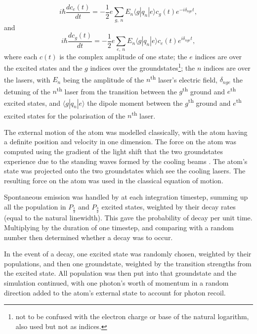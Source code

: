 \begin{equation}
i\hbar\frac{dc_e(t)}{dt} = -\frac12e\sum_{g,\ n} E_n \langle g |  q_n | e \rangle c_g(t) e^{-i\delta_{nge}t},
\end{equation}
and
\begin{equation}
i\hbar\frac{dc_g(t)}{dt} = -\frac12e\sum_{e,\ n} E_n \langle g |  q_n | e \rangle c_e(t) e^{i\delta_{nge}t},
\end{equation}
where each $c(t)$ is the complex amplitude of one state; the $e$ indices are over the excited states and the $g$ indices over the groundstates\footnote{not to be confused with the electron charge or base of the natural logarithm, also used but not as indices.}; the $n$ indices are over the lasers, with $E_n$ being the amplitude of the $n$\textsuperscript{th} laser's electric field, $\delta_{nge}$ the detuning of the $n$\textsuperscript{th} laser from the transition between the $g$\textsuperscript{th} ground and $e$\textsuperscript{th} excited states, and $\langle g |  q_n | e \rangle$ the dipole moment between the $g$\textsuperscript{th} ground and $e$\textsuperscript{th} excited states for the polarisation of the $n$\textsuperscript{th} laser.

The external motion of the atom was modelled classically, with the atom having a definite position and velocity in one dimension. The force on the atom was computed using the gradient of the light shift that the two groundstates experience due to the standing waves formed by the cooling beams \cite[eqn 3.16, p 33]{metcalf_laser_1999}. The atom's state was projected onto the two groundstates which see the cooling lasers. The resulting force on the atom was used in the classical equation of motion.

Spontaneous emission was handled by at each integration timestep, summing up all the population in $P_\frac12$ and $P_\frac32$ excited states, weighted by their decay rates (equal to the natural linewidth). This gave the probability of decay per unit time. Multiplying by the duration of one timestep, and comparing with a random number then determined whether a decay was to occur.

In the event of a decay, one excited state was randomly chosen, weighted by their populations, and then one groundstate, weighted by the transition strengths from the excited state. All population was then put into that groundstate and the simulation continued, with one photon's worth of momentum in a random direction added to the atom's external state to account for photon recoil.

